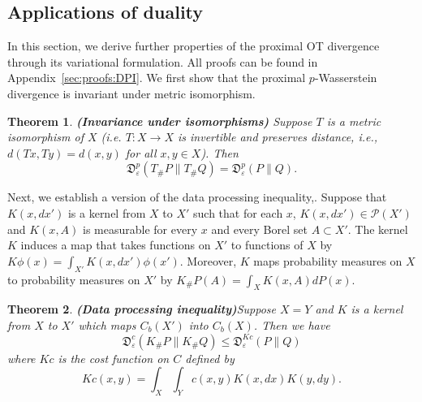 \documentclass{amsart}
\newtheorem{theorem}{Theorem}[section]
\theoremstyle{definition}
\theoremstyle{remark}
\numberwithin{equation}{section}
\begin{document}
\subsection{Applications of duality}
\label{sec:DPI}
In this section, we derive further properties of the proximal OT divergence through its variational formulation. All proofs can be found in Appendix~\ref{sec:proofs:DPI}. We first show that the proximal $p$-Wasserstein divergence is invariant under metric isomorphism. 
\begin{theorem}{\bf(Invariance under isomorphisms)} \label{thm:isomorphism.invariance} Suppose $T$ is a metric isomorphism of $X$ (i.e. $T:X \to X$ is invertible and preserves distance, i.e., $d(Tx,Ty)=d(x,y)$ for all $x,y \in X$). Then 
\begin{equation}\label{eq:DPIisomorphism}
 \mathfrak{D}^{p}_\varepsilon( T_\# P\| T_\# Q) = \mathfrak{D}^{p}_\varepsilon( P\| Q).
\end{equation}
\end{theorem}




Next, we establish a version of the data processing inequality,\cite{van2014renyi}. Suppose that $K(x,dx')$ is a kernel from $X$ to $X'$ such that for each $x$, $K(x,dx') \in \mathcal{P}(X')$ and $K(x,A)$ is measurable for every $x$ and every Borel set $A\subset X'$. 
The kernel $K$ induces a map that takes functions on $X'$ to functions of $X$ by $K\phi(x)=\int_{X'} K(x, dx') \phi(x')$. Moreover, $K$ maps probability measures on $X$ to probability measures on $X'$ by 
$K_\# P(A) = \int_X K(x,A) dP(x)$. 

\begin{theorem}{\bf (Data processing inequality)}\label{thm:dpi}
Suppose $X=Y$ and $K$ is a kernel from $X$ to $X'$ which maps $C_b(X')$ into $C_b(X)$. Then we have 
\begin{equation}\label{eq:DPIgeneral}
 \mathfrak{D}^{c}_\varepsilon( K_\# P\| K_\# Q) \le  \mathfrak{D}^{K c}_\varepsilon( P\| Q)
\end{equation}
where $Kc$ is the cost function on $C$ defined by 
\begin{equation}\label{eq:Kc}
Kc(x,y) = \int_X \int_Y c(x,y) K(x,dx) K(y,dy).
\end{equation}
\end{theorem}
\end{document}
